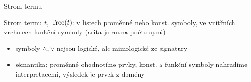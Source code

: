 \documentclass{beamer}
\begin{document}
\begin{frame}{Strom termu}
    
    \vspace{-3pt}
    \alert{Strom termu} $t$, \alert{$\operatorname{Tree}(t)$}: v listech proměnné nebo konst. symboly, ve vnitřních vrcholech funkční symboly (arita je rovna počtu synů) \pause 

    \begin{center}

    \end{center} \pause 

    \begin{itemize}
        \item symboly $\land,\lor$ nejsou logické, ale mimologické ze signatury \pause 
        \item \alert{sémantika}: proměnné ohodnotíme prvky, konst. a funkční symboly nahradíme interpretacemi, výsledek je prvek z domény
    \end{itemize}
    
\end{frame}
\end{document}
